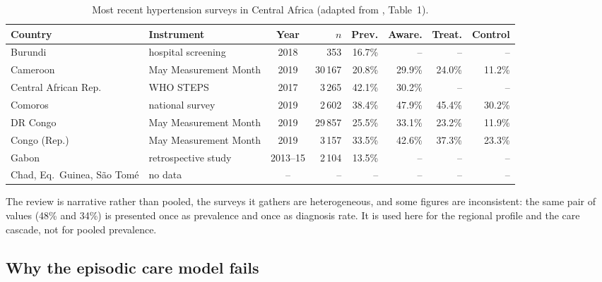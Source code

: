 \documentclass[12pt,a4paper,oneside]{report}
\begin{document}
\begin{table}[htbp]
\centering\footnotesize
\caption{Most recent hypertension surveys in Central Africa (adapted from \cite{gafane2024}, Table~1).}\label{tab:central-africa}
\begin{tabularx}{\textwidth}{@{}l >{\raggedright\arraybackslash}X c r r r r r@{}}
\toprule
\textbf{Country} & \textbf{Instrument} & \textbf{Year} & \textbf{$n$} & \textbf{Prev.} & \textbf{Aware.} & \textbf{Treat.} & \textbf{Control} \\
\midrule
Burundi & hospital screening & 2018 & 353 & 16.7\% & -- & -- & -- \\
Cameroon & May Measurement Month & 2019 & 30\,167 & 20.8\% & 29.9\% & 24.0\% & 11.2\% \\
Central African Rep. & WHO STEPS & 2017 & 3\,265 & 42.1\% & 30.2\% & -- & -- \\
Comoros & national survey & 2019 & 2\,602 & 38.4\% & 47.9\% & 45.4\% & 30.2\% \\
DR Congo & May Measurement Month & 2019 & 29\,857 & 25.5\% & 33.1\% & 23.2\% & 11.9\% \\
Congo (Rep.) & May Measurement Month & 2019 & 3\,157 & 33.5\% & 42.6\% & 37.3\% & 23.3\% \\
Gabon & retrospective study & 2013--15 & 2\,104 & 13.5\% & -- & -- & -- \\
Chad, Eq.\ Guinea, S\~ao Tom\'e & no data & -- & -- & -- & -- & -- & -- \\
\bottomrule
\end{tabularx}
\end{table}

The review is narrative rather than pooled, the surveys it gathers are heterogeneous, and some figures are inconsistent: the same pair of values (48\% and 34\%) is presented once as prevalence and once as diagnosis rate. It is used here for the regional profile and the care cascade, not for pooled prevalence.

\subsection{Why the episodic care model fails}\label{sec:ltfu}\label{sec:inertia}\label{sec:time}\label{sec:records}
\end{document}
